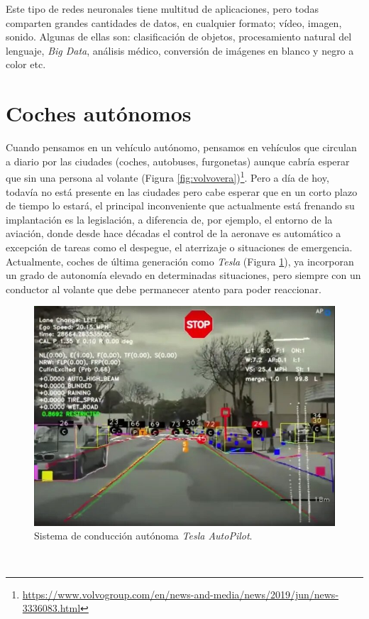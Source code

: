 Este tipo de redes neuronales tiene multitud de aplicaciones, pero todas comparten grandes cantidades de datos, en cualquier formato; vídeo, imagen, sonido. Algunas de ellas son: clasificación de objetos, procesamiento natural del lenguaje, \textit{Big Data}, análisis médico, conversión de imágenes en blanco y negro a color etc.\\

\section{Coches autónomos}
\label{sec:cochesautonomos}
Cuando pensamos en un vehículo autónomo, pensamos en vehículos que circulan a diario por las ciudades (coches, autobuses, furgonetas) aunque cabría esperar que sin una persona al volante (Figura \ref{fig:volvovera})\footnote{\url{https://www.volvogroup.com/en/news-and-media/news/2019/jun/news-3336083.html}}. Pero a día de hoy, todavía no está presente en las ciudades pero cabe esperar que en un corto plazo de tiempo lo estará, el principal inconveniente que actualmente está frenando su implantación es la legislación, a diferencia de, por ejemplo, el entorno de la aviación, donde desde hace décadas el control de la aeronave es automático a excepción de tareas como el despegue, el aterrizaje o situaciones de emergencia.\\

Actualmente, coches de última generación como \textit{Tesla} (Figura \ref{fig:teslaobjectdetection}), ya incorporan un grado de autonomía elevado en determinadas situaciones, pero siempre con un conductor al volante que debe permanecer atento para poder reaccionar.\\

\begin{figure} [h!]
	\begin{center}
		\includegraphics[width=12cm]{figs/teslaobjectdetection}
	\end{center}
	\caption{Sistema de conducción autónoma \textit{Tesla AutoPilot}.}
	\label{fig:teslaobjectdetection}
\end{figure}\

